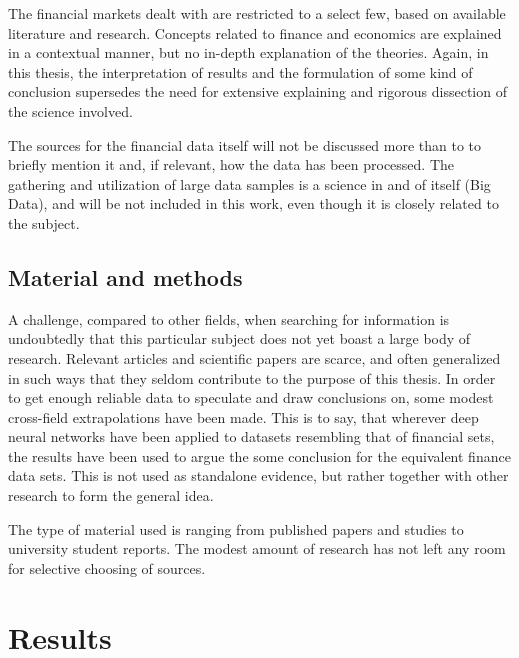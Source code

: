 The financial markets dealt with are restricted to a select few, based on available literature and research. Concepts related to finance and economics are explained in a contextual manner, but no in-depth explanation of the theories. Again, in this thesis, the interpretation of results and the formulation of some kind of conclusion supersedes the need for extensive explaining and rigorous dissection of the science involved.

The sources for the financial data itself will not be discussed more than to to briefly mention it and, if relevant, how the data has been processed. The gathering and utilization of large data samples is a science in and of itself (Big Data), and will be not included in this work, even though it is closely related to the subject.


\subsection{Material and methods}


A challenge, compared to other fields, when searching for information is undoubtedly that this particular subject does not yet boast a large body of research. Relevant articles and scientific papers are scarce, and often generalized in such ways that they seldom contribute to the purpose of this thesis. In order to get enough reliable data to speculate and draw conclusions on, some modest cross-field extrapolations have been made. This is to say, that wherever deep neural networks have been applied to datasets resembling that of financial sets, the results have been used to argue the some conclusion for the equivalent finance data sets. This is not used as standalone evidence, but rather together with other research to form the general idea.

The type of material used is ranging from published papers and studies to university student reports. The modest amount of research has not left any room for selective choosing of sources.



\newpage

\section{Results}
